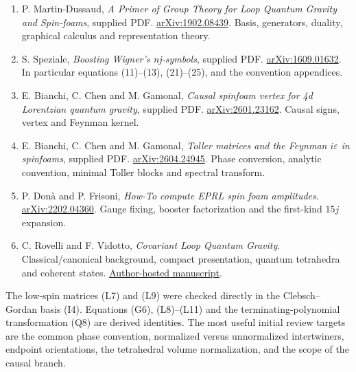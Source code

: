 \documentclass[11pt,a4paper]{article}
\begin{document}
\begin{enumerate}
\item P. Martin-Dussaud, \emph{A Primer of Group Theory for Loop Quantum Gravity and Spin-foams}, supplied PDF. \href{https://arxiv.org/abs/1902.08439}{arXiv:1902.08439}. Basis, generators, duality, graphical calculus and representation theory.
\item S. Speziale, \emph{Boosting Wigner's nj-symbols}, supplied PDF. \href{https://arxiv.org/abs/1609.01632}{arXiv:1609.01632}. In particular equations (11)--(13), (21)--(25), and the convention appendices.
\item E. Bianchi, C. Chen and M. Gamonal, \emph{Causal spinfoam vertex for 4d Lorentzian quantum gravity}, supplied PDF. \href{https://arxiv.org/abs/2601.23162}{arXiv:2601.23162}. Causal signs, vertex and Feynman kernel.
\item E. Bianchi, C. Chen and M. Gamonal, \emph{Toller matrices and the Feynman $i\varepsilon$ in spinfoams}, supplied PDF. \href{https://arxiv.org/abs/2604.24945}{arXiv:2604.24945}. Phase conversion, analytic convention, minimal Toller blocks and spectral transform.
\item P. Don\`a and P. Frisoni, \emph{How-To compute EPRL spin foam amplitudes}. \href{https://arxiv.org/abs/2202.04360}{arXiv:2202.04360}. Gauge fixing, booster factorization and the first-kind $15j$ expansion.
\item C. Rovelli and F. Vidotto, \emph{Covariant Loop Quantum Gravity}. Classical/canonical background, compact presentation, quantum tetrahedra and coherent states. \href{https://www.cpt.univ-mrs.fr/~rovelli/IntroductionLQG.pdf}{Author-hosted manuscript}.
\end{enumerate}

The low-spin matrices (L7) and (L9) were checked directly in the Clebsch--Gordan basis (I4). Equations (G6), (L8)--(L11) and the terminating-polynomial transformation (Q8) are derived identities. The most useful initial review targets are the common phase convention, normalized versus unnormalized intertwiners, endpoint orientations, the tetrahedral volume normalization, and the scope of the causal branch.
\end{document}
